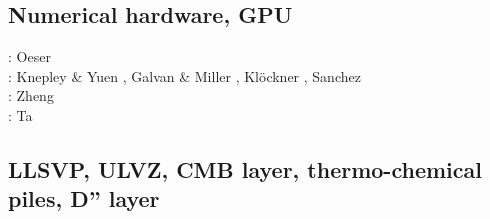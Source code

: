 \subsection{Numerical hardware, GPU}
\label{sec:topics:hardware}

\begin{scriptsize}
\twothousandsix: Oeser \etal \cite{oebm06}\\
\twothousandthirteen: Knepley \& Yuen \cite{knyu13}, Galvan \& Miller \cite{gami13}, 
                      Kl\"ockner \etal \cite{klwh13}, Sanchez \etal \cite{sagy13}\\
\twothousandfourteen: Zheng \etal{} \cite{zhzg14}\\
\twothousandfifteen: Ta \etal \cite{tact15}\\
\end{scriptsize}

\subsection{LLSVP, ULVZ, CMB layer, thermo-chemical piles, D'' layer}

